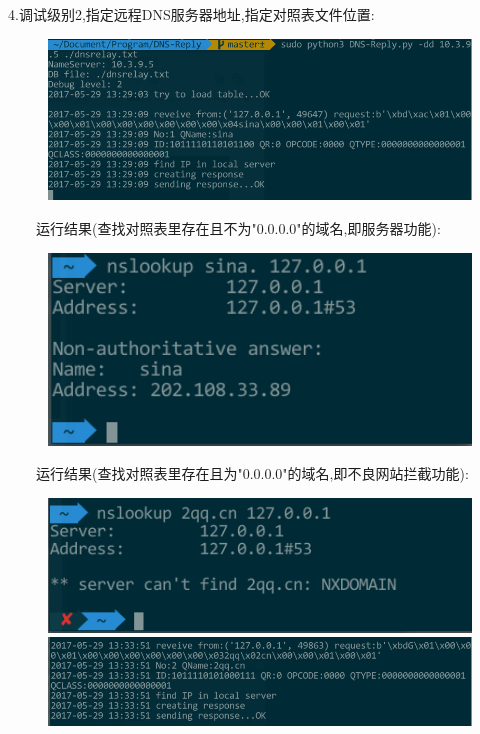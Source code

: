 \documentclass{ctexart}
\begin{document}
4.调试级别2,指定远程DNS服务器地址,指定对照表文件位置:
\begin{figure}[H]
  \centering
  \includegraphics[width=15cm]{img/debug-level-2.png}
\end{figure}

\ \ \ \ 运行结果(查找对照表里存在且不为"0.0.0.0"的域名,即服务器功能):
\begin{figure}[H]
  \centering
  \includegraphics[width=15cm]{img/debug-level-2-local-result.png}
\end{figure}

\pagebreak[4]

\ \ \ \ 运行结果(查找对照表里存在且为"0.0.0.0"的域名,即不良网站拦截功能):
\begin{figure}[H]
  \centering
  \includegraphics[width=15cm]{img/debug-level-2-local-0-result.png}
  \includegraphics[width=15cm]{img/debug-level-2-local.png}
\end{figure}
\end{document}
